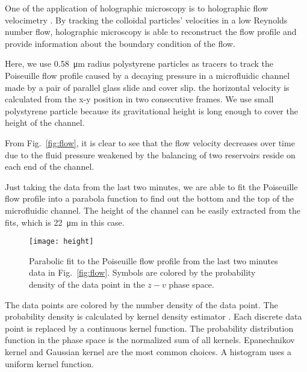 One of the application of holographic microscopy is to holographic flow velocimetry \cite{cheong09}. By tracking the colloidal particles' velocities in a low Reynolds number flow, holographic microscopy is able to reconstruct the flow profile and provide information about the boundary condition of the flow.

Here, we use \SI{0.58}{\um} radius polystyrene particles as tracers to track the Poiseuille flow profile caused by a decaying pressure in a microfluidic channel made by a pair of parallel glass slide and cover slip. the horizontal velocity is calculated from the x-y position in two consecutive frames. We use small polystyrene particle because its gravitational height is long enough to cover the height of the channel.

From Fig.~\ref{fig:flow}, it is clear to see that the flow velocity decreases over time due to the fluid pressure weakened by the balancing of two reservoirs reside on each end of the channel.

Just taking the data from the last two minutes, we are able to fit the Poiseuille flow profile into a parabola function to find out the bottom and the top of the microfluidic channel. The height of the channel can be easily extracted from the fits, which is \SI{22}{\um} in this case.

\begin{figure}[t!]
  \centering
  \texttt{[image: height]}
  \caption[Parabolic fit to the Poiseuille flow profile]
  {Parabolic fit to the Poiseuille flow profile from the last two minutes data in 
  Fig.~\ref{fig:flow}. Symbols are colored by the probability density of the data 
  point in the $z-v$ phase space.}
  \label{fig:height}
\end{figure}

The data points are colored by the number density of the data point. The probability density is calculated by kernel density estimator \cite{silverman86}. Each discrete data point is replaced by a continuous kernel function. The probability distribution function in the phase space is the normalized sum of all kernels. Epanechnikov kernel and Gaussian kernel are the most common choices. A histogram uses a uniform kernel function.